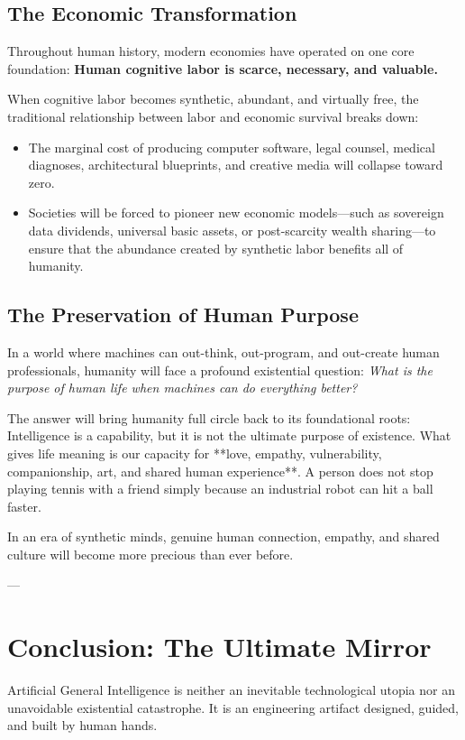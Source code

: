 \documentclass[11pt,journal,onecolumn]{IEEEtran}
\begin{document}
\subsection{The Economic Transformation}
Throughout human history, modern economies have operated on one core foundation: \textbf{Human cognitive labor is scarce, necessary, and valuable.}

When cognitive labor becomes synthetic, abundant, and virtually free, the traditional relationship between labor and economic survival breaks down:
\begin{itemize}
    \item The marginal cost of producing computer software, legal counsel, medical diagnoses, architectural blueprints, and creative media will collapse toward zero.
    \item Societies will be forced to pioneer new economic models---such as sovereign data dividends, universal basic assets, or post-scarcity wealth sharing---to ensure that the abundance created by synthetic labor benefits all of humanity.
\end{itemize}

\subsection{The Preservation of Human Purpose}
In a world where machines can out-think, out-program, and out-create human professionals, humanity will face a profound existential question: \textit{What is the purpose of human life when machines can do everything better?}

The answer will bring humanity full circle back to its foundational roots:
Intelligence is a capability, but it is not the ultimate purpose of existence. What gives life meaning is our capacity for **love, empathy, vulnerability, companionship, art, and shared human experience**. A person does not stop playing tennis with a friend simply because an industrial robot can hit a ball faster. 

In an era of synthetic minds, genuine human connection, empathy, and shared culture will become more precious than ever before.

---

\section{Conclusion: The Ultimate Mirror}
\label{sec:conclusion}

Artificial General Intelligence is neither an inevitable technological utopia nor an unavoidable existential catastrophe. It is an engineering artifact designed, guided, and built by human hands.
\end{document}
